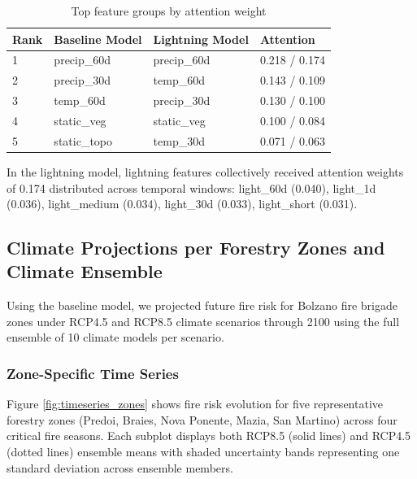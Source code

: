 \documentclass[11pt,a4paper]{article}
\begin{document}
\begin{table}[H]
\centering
\caption{Top feature groups by attention weight}
\label{tab:attention}
\begin{tabular}{llll}
\toprule
\textbf{Rank} & \textbf{Baseline Model} & \textbf{Lightning Model} & \textbf{Attention} \\
\midrule
1 & precip\_60d & precip\_60d & 0.218 / 0.174 \\
2 & precip\_30d & temp\_60d & 0.143 / 0.109 \\
3 & temp\_60d & precip\_30d & 0.130 / 0.100 \\
4 & static\_veg & static\_veg & 0.100 / 0.084 \\
5 & static\_topo & temp\_30d & 0.071 / 0.063 \\
\bottomrule
\end{tabular}
\end{table}

In the lightning model, lightning features collectively received attention weights of 0.174 distributed across temporal windows: light\_60d (0.040), light\_1d (0.036), light\_medium (0.034), light\_30d (0.033), light\_short (0.031).

\subsection{Climate Projections per Forestry Zones and Climate Ensemble}

Using the baseline model, we projected future fire risk for Bolzano fire brigade zones under RCP4.5 and RCP8.5 climate scenarios through 2100 using the full ensemble of 10 climate models per scenario.

\subsubsection{Zone-Specific Time Series}

Figure \ref{fig:timeseries_zones} shows fire risk evolution for five representative forestry zones (Predoi, Braies, Nova Ponente, Mazia, San Martino) across four critical fire seasons. Each subplot displays both RCP8.5 (solid lines) and RCP4.5 (dotted lines) ensemble means with shaded uncertainty bands representing one standard deviation across ensemble members.
\end{document}
